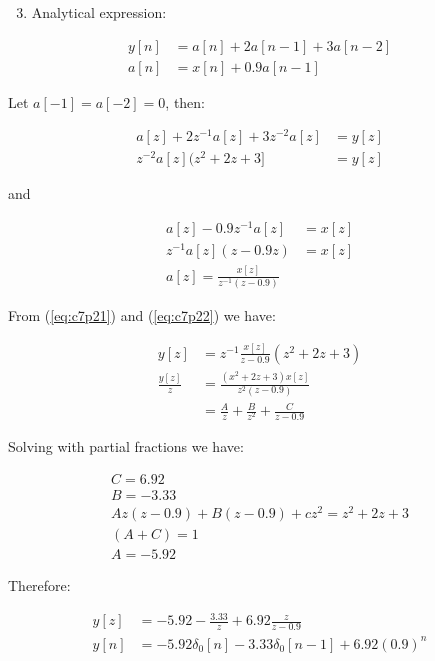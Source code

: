 \begin{enumerate}
\setcounter{enumi}{2}
\item Analytical expression:
\end{enumerate} 

\begin{equation*}
\begin{aligned}
y[n] &= a[n] + 2a[n-1] + 3a[n-2] \\
a[n] &= x[n] + 0.9a[n-1]
\end{aligned}
\end{equation*} 

Let $a[-1]=a[-2]=0$, then:

\begin{equation}
\begin{aligned}
a[z] + 2z^{-1}a[z]+3z^{-2}a[z] &= y[z] \\
z^{-2}a[z](z^2+2z+3] &= y[z]
\end{aligned}
\label{eq:c7p21}
\end{equation} 

and

\begin{equation}
\begin{aligned}
a[z] - 0.9z^{-1}a[z] &= x[z]\\
z^{-1}a[z](z-0.9z) &= x[z] \\
a[z] = \frac{x[z]}{z^{-1}(z-0.9)}
\end{aligned}
\label{eq:c7p22}
\end{equation}

From (\ref{eq:c7p21})  and (\ref{eq:c7p22}) we have:

\begin{equation*}
\begin{aligned}
y[z] &= z^{-1}\frac{x[z]}{z-0.9} (z^2+2z+3)\\
\frac{y[z]}{z} &= \frac{(x^2+2z+3)x[z]}{z^2(z-0.9)} \\
&= \frac{A}{z} + \frac{B}{z^2} + \frac{C}{z-0.9}
\end{aligned}
\end{equation*} 

Solving with partial fractions we have:

\begin{equation*}
\begin{aligned}
C= 6.92\\
B= -3.33\\
Az(z-0.9) + B(z-0.9) + cz^2 = z^2+2z+3\\
(A+C) = 1 \\
A = -5.92
\end{aligned}
\end{equation*} 

Therefore:

\begin{equation*}
\begin{aligned}
y[z] &= -5.92 - \frac{3.33}{z} + 6.92 \frac{z}{z-0.9} \\
y[n] &= -5.92 \delta_0[n] - 3.33 \delta_0[n-1] + 6.92 (0.9)^n
\end{aligned}
\end{equation*} 

